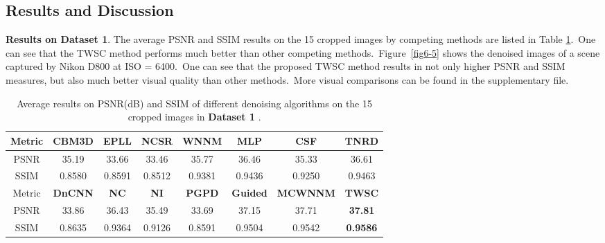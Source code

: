 \subsection{Results and Discussion}

\textbf{Results on Dataset 1}. The average PSNR and SSIM results on the 15 cropped images by competing methods are listed in Table \ref{tab6-6}.\ One can see that the TWSC method performs much better than other competing methods.\ Figure\ \ref{fig6-5} shows the denoised images of a scene captured by Nikon D800 at ISO = 6400.\ One can see that the proposed TWSC method results in not only higher PSNR and SSIM measures, but also much better visual quality than other methods.\ More visual comparisons can be found in the supplementary file.

\begin{table}[hbp]
\caption{Average results on PSNR(dB) and SSIM of different denoising algorithms on the 15 cropped images in \textbf{Dataset 1} \cite{crosschannel2016}.}
\scriptsize
\label{tab6-6}
\begin{center}
\renewcommand\arraystretch{1.2}
\begin{tabular*}{1\textwidth}{@{\extracolsep{\fill}}cccccccc}
\hline
Metric
&
\textbf{CBM3D}
&
\textbf{EPLL}
&
\textbf{NCSR}
&
\textbf{WNNM}
&
\textbf{MLP}
&
\textbf{CSF}
&
\textbf{TNRD}
\\
\hline
PSNR & 35.19  & 33.66 & 33.46 &  35.77 &  36.46 & 35.33 & 36.61  
\\
\hline
SSIM & 0.8580 & 0.8591  & 0.8512 & 0.9381 &  0.9436  & 0.9250 & 0.9463 
\\
\hline
Metric
&
\textbf{DnCNN}
&
\textbf{NC}
&
\textbf{NI}
&
\textbf{PGPD}
&
\textbf{Guided}
&
\textbf{MCWNNM}
&
\textbf{TWSC}
\\
\hline
PSNR &  33.86  & 36.43  & 35.49  & 33.69  &  37.15 &  37.71 &  \textbf{37.81}
\\
\hline
SSIM & 0.8635  &  0.9364 & 0.9126  & 0.8591  & 0.9504 &  0.9542 & \textbf{0.9586}
\\
\hline
\end{tabular*}
\end{center}
\end{table}

